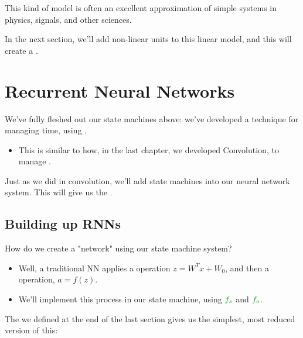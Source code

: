         

        This kind of model is often an excellent approximation of simple systems in physics, signals, and other sciences.

        \subsecdiv

        In the next section, we'll add non-linear units to this linear model, and this will create a .\\



\pagebreak
\fi

\section{Recurrent Neural Networks}

    We've fully fleshed out our state machines above: we've developed a technique for managing time, using .

    \begin{itemize}
        \item This is similar to how, in the last chapter, we developed Convolution, to manage .
    \end{itemize}

    Just as we did in convolution, we'll add state machines into our neural network system. This will give us the .



    \phantom{}

    \subsection{Building up RNNs}

        How do we create a "network" using our state machine system?

        \begin{itemize}
            \item  Well, a traditional NN applies a  operation $z=W^Tx+W_0$, and then a  operation, $a=f(z)$.
            
            \item We'll implement this process in our state machine, using $\grn{f_s}$ and $\grn{f_o}$.
        \end{itemize}

        The  we defined at the end of the last section gives us the simplest, most reduced version of this:

